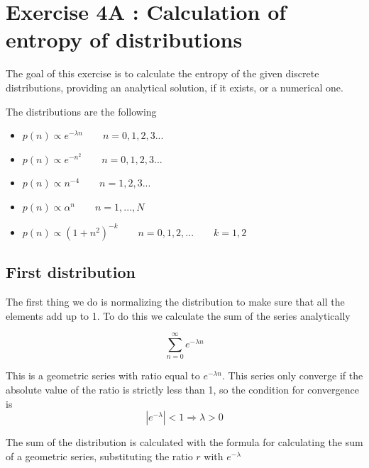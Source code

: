 \chapter{Exercise 4A : Calculation of entropy of distributions}

The goal of this exercise is to calculate the entropy of the given discrete distributions, providing an analytical solution, if it exists, or a numerical one.

The distributions are the following

\begin{itemize}
	\item $ p(n) \propto e^{-\lambda n}  \qquad n = 0,1,2,3... $
	\item $ p(n) \propto e^{-n^2} \qquad n = 0,1,2,3...$
	\item $ p(n) \propto n^{-4} \qquad n = 1,2,3...$
	\item $ p(n) \propto \alpha^{n} \qquad n = 1,...,N $
	\item $ p(n) \propto (1 + n^2)^{-k} \qquad n = 0,1,2,... \qquad k = 1,2 $
\end{itemize}

\section{First distribution}

The first thing we do is normalizing the distribution to make sure that all the elements add up to 1. To do this we calculate the sum of the series analytically

\[ 
	\sum_{n=0}^{\infty} e^{- \lambda n}
\]

This is a geometric series with ratio equal to $ e^{- \lambda n} $.
This series only converge if the absolute value of the ratio is strictly less than 1, so the condition for convergence is
\[ 
	  |e^{- \lambda}| < 1   \Longrightarrow  \lambda > 0
\]

The sum of the distribution is calculated with the formula for calculating the sum of a geometric series, substituting the ratio $r$ with 
$e^{- \lambda}$

